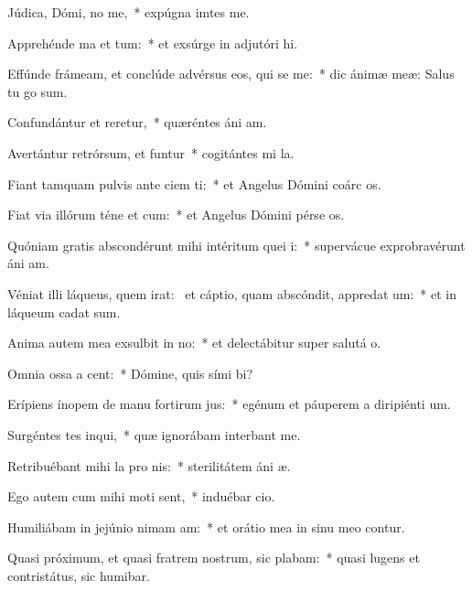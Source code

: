 \item Júdica, Dómi, no me,~* expúgna imtes me.
\item Apprehénde ma et tum:~* et exsúrge in adjutóri hi.
\item Effúnde frámeam, et conclúde advérsus eos, qui se me:~* dic ánimæ meæ: Salus tu go sum.
\item Confundántur et reretur,~* quæréntes áni am.
\item Avertántur retrórsum, et funtur~* cogitántes mi la.
\item Fiant tamquam pulvis ante ciem ti:~* et Angelus Dómini coárc os.
\item Fiat via illórum téne et cum:~* et Angelus Dómini pérse os.
\item Quóniam gratis abscondérunt mihi intéritum quei i:~* supervácue exprobravérunt áni am.
\item Véniat illi láqueus, quem irat:~\pscross{} et cáptio, quam abscóndit, appredat um:~* et in láqueum cadat  sum.
\item Anima autem mea exsulbit in no:~* et delectábitur super salutá o.
\item Omnia ossa a cent:~* Dómine, quis sími bi?
\item Erípiens ínopem de manu fortirum jus:~* egénum et páuperem a diripiénti um.
\item Surgéntes tes inqui,~* quæ ignorábam interbant me.
\item Retribuébant mihi la pro nis:~* sterilitátem áni æ.
\item Ego autem cum mihi moti sent,~* induébar cio.
\item Humiliábam in jejúnio nimam am:~* et orátio mea in sinu meo contur.
\item Quasi próximum, et quasi fratrem nostrum, sic plabam:~* quasi lugens et contristátus, sic humibar.

